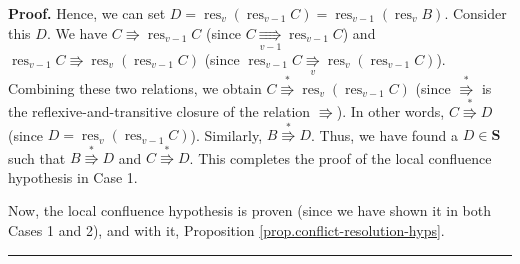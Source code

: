\documentclass[numbers=enddot,12pt,final,onecolumn,notitlepage]{scrartcl}%
\theoremstyle{definition}
\newenvironment{proof}[1][Proof]{\noindent\textbf{#1.} }{\ \rule{0.5em}{0.5em}}
\newenvironment{vershort}{}{}
\begin{document}
\begin{vershort}
\begin{proof}
Hence, we can set $D=\operatorname*{res}\nolimits_{v}\left(
\operatorname*{res}\nolimits_{v-1}C\right)  =\operatorname*{res}%
\nolimits_{v-1}\left(  \operatorname*{res}\nolimits_{v}B\right)  $. Consider
this $D$. We have $C\Rrightarrow\operatorname*{res}\nolimits_{v-1}C$ (since
$C\underset{v-1}{\Rrightarrow}\operatorname*{res}\nolimits_{v-1}C$) and
$\operatorname*{res}\nolimits_{v-1}C\Rrightarrow\operatorname*{res}%
\nolimits_{v}\left(  \operatorname*{res}\nolimits_{v-1}C\right)  $ (since
$\operatorname*{res}\nolimits_{v-1}C\underset{v}{\Rrightarrow}%
\operatorname*{res}\nolimits_{v}\left(  \operatorname*{res}\nolimits_{v-1}%
C\right)  $). Combining these two relations, we obtain $C\overset{\ast
}{\Rrightarrow}\operatorname*{res}\nolimits_{v}\left(  \operatorname*{res}%
\nolimits_{v-1}C\right)  $ (since $\overset{\ast}{\Rrightarrow}$ is the
reflexive-and-transitive closure of the relation $\Rrightarrow$). In other
words, $C\overset{\ast}{\Rrightarrow}D$ (since $D=\operatorname*{res}%
\nolimits_{v}\left(  \operatorname*{res}\nolimits_{v-1}C\right)  $).
Similarly, $B\overset{\ast}{\Rrightarrow}D$. Thus, we have found a
$D\in\mathbf{S}$ such that $B\overset{\ast}{\Rrightarrow}D$ and
$C\overset{\ast}{\Rrightarrow}D$. This completes the proof of the local
confluence hypothesis in Case 1.

Now, the local confluence hypothesis is proven (since we have shown it in both
Cases 1 and 2), and with it, Proposition \ref{prop.conflict-resolution-hyps}.
\end{proof}
\end{vershort}
\end{document}
